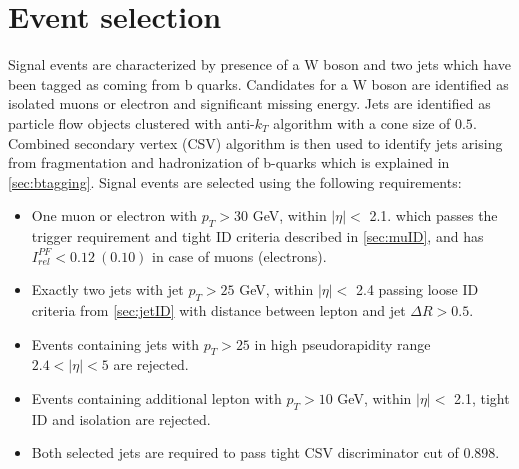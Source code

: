 \section{Event selection}
\label{sec:selection}
Signal events are characterized by presence of a W boson and two jets which have been tagged as coming from b quarks. 
Candidates for a W boson are identified as isolated muons or electron and significant missing energy. 
Jets are identified as particle flow objects clustered with anti-$k_T$ algorithm with a cone size of $0.5$.
Combined secondary vertex (CSV) algorithm is then used to identify jets arising from fragmentation and hadronization of b-quarks which is explained in \ref{sec:btagging}. Signal events are selected using the following requirements:
\begin{itemize}
\item One muon or electron with $p_T>30$ GeV, within $|\eta|<$ 2.1. which passes the trigger requirement and tight ID criteria described in \ref{sec:muID}, and has $I_{rel}^{PF}<0.12\ (0.10)$ in case of muons (electrons).
\item Exactly two jets with jet $p_T>25$ GeV, within $|\eta|<$ 2.4 passing loose ID criteria from \ref{sec:jetID} with distance between lepton and jet $\Delta R>0.5$. 
\item Events containing jets with $p_T>25$ in high pseudorapidity range $2.4<|\eta|<5$ are rejected.
\item Events containing additional lepton with $p_T>10$ GeV, within $|\eta|<$ 2.1, tight ID and isolation are rejected.
\item Both selected jets are required to pass tight CSV discriminator cut of 0.898.
\end{itemize} 

